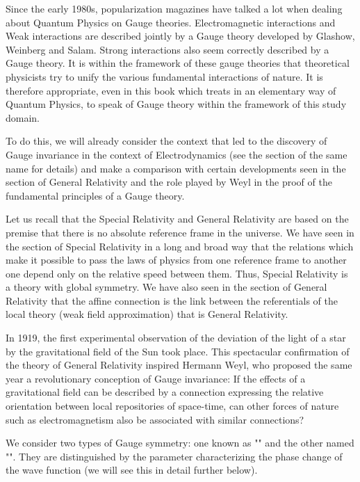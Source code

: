 	Since the early 1980s, popularization magazines have talked a lot when dealing about Quantum Physics on Gauge theories. Electromagnetic interactions and Weak interactions are described jointly by a Gauge theory developed by Glashow, Weinberg and Salam. Strong interactions also seem correctly described by a Gauge theory. It is within the framework of these gauge theories that theoretical physicists try to unify the various fundamental interactions of nature. It is therefore appropriate, even in this book which treats in an elementary way of Quantum Physics, to speak of Gauge theory within the framework of this study domain.
	
	To do this, we will already consider the context that led to the discovery of Gauge invariance in the context of Electrodynamics (see the section of the same name for details) and make a comparison with certain developments seen in the section of General Relativity and the role played by Weyl in the proof of the fundamental principles of a Gauge theory.

	Let us recall that the Special Relativity and General Relativity are based on the premise that there is no absolute reference frame in the universe. We have seen in the section of Special Relativity in a long and broad way that the relations which make it possible to pass the laws of physics from one reference frame to another one depend only on the relative speed between them. Thus, Special Relativity is a theory with global symmetry. We have also seen in the section of General Relativity that the affine connection is the link between the referentials of the local theory (weak field approximation) that is General Relativity.
	
	In 1919, the first experimental observation of the deviation of the light of a star by the gravitational field of the Sun took place. This spectacular confirmation of the theory of General Relativity inspired Hermann Weyl, who proposed the same year a revolutionary conception of Gauge invariance: If the effects of a gravitational field can be described by a connection expressing the relative orientation between local repositories of space-time, can other forces of nature such as electromagnetism also be associated with similar connections?

	We consider two types of Gauge symmetry: one known as "" and the other named "". They are distinguished by the parameter characterizing the phase change of the wave function (we will see this in detail further below).
	
